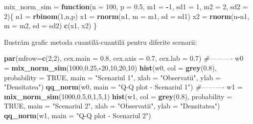 \documentclass[]{article}
\newenvironment{Shaded}{\begin{snugshade}}{\end{snugshade}}
\newcommand{\KeywordTok}[1]{\textcolor[rgb]{0.13,0.29,0.53}{\textbf{#1}}}
\newcommand{\DataTypeTok}[1]{\textcolor[rgb]{0.13,0.29,0.53}{#1}}
\newcommand{\DecValTok}[1]{\textcolor[rgb]{0.00,0.00,0.81}{#1}}
\newcommand{\FloatTok}[1]{\textcolor[rgb]{0.00,0.00,0.81}{#1}}
\newcommand{\StringTok}[1]{\textcolor[rgb]{0.31,0.60,0.02}{#1}}
\newcommand{\CommentTok}[1]{\textcolor[rgb]{0.56,0.35,0.01}{\textit{#1}}}
\newcommand{\OtherTok}[1]{\textcolor[rgb]{0.56,0.35,0.01}{#1}}
\newcommand{\ControlFlowTok}[1]{\textcolor[rgb]{0.13,0.29,0.53}{\textbf{#1}}}
\newcommand{\OperatorTok}[1]{\textcolor[rgb]{0.81,0.36,0.00}{\textbf{#1}}}
\newcommand{\NormalTok}[1]{#1}
\begin{document}
\begin{Shaded}
\begin{Highlighting}[]
\NormalTok{mix_norm_sim =}\StringTok{ }\ControlFlowTok{function}\NormalTok{(}\DataTypeTok{n =} \DecValTok{100}\NormalTok{, }\DataTypeTok{p =} \FloatTok{0.5}\NormalTok{, }\DataTypeTok{m1 =} \OperatorTok{-}\DecValTok{1}\NormalTok{, }\DataTypeTok{sd1 =} \DecValTok{1}\NormalTok{, }\DataTypeTok{m2 =} \DecValTok{2}\NormalTok{, }\DataTypeTok{sd2 =} \DecValTok{2}\NormalTok{)\{}
\NormalTok{  n1 =}\StringTok{ }\KeywordTok{rbinom}\NormalTok{(}\DecValTok{1}\NormalTok{,n,p)}
\NormalTok{  x1 =}\StringTok{ }\KeywordTok{rnorm}\NormalTok{(n1, }\DataTypeTok{m =}\NormalTok{ m1, }\DataTypeTok{sd =}\NormalTok{ sd1)}
\NormalTok{  x2 =}\StringTok{ }\KeywordTok{rnorm}\NormalTok{(n}\OperatorTok{-}\NormalTok{n1, }\DataTypeTok{m =}\NormalTok{ m2, }\DataTypeTok{sd =}\NormalTok{ sd2)}
  \KeywordTok{c}\NormalTok{(x1, x2)}
\NormalTok{\}}
\end{Highlighting}
\end{Shaded}

Ilustrăm grafic metoda cuantilă-cuantilă pentru diferite scenarii:

\begin{Shaded}
\begin{Highlighting}[]
\KeywordTok{par}\NormalTok{(}\DataTypeTok{mfrow=}\KeywordTok{c}\NormalTok{(}\DecValTok{2}\NormalTok{,}\DecValTok{2}\NormalTok{),}
     \DataTypeTok{cex.main =} \FloatTok{0.8}\NormalTok{,}
     \DataTypeTok{cex.axis =} \FloatTok{0.7}\NormalTok{,}
     \DataTypeTok{cex.lab =} \FloatTok{0.7}\NormalTok{)}
\CommentTok{#----------}
\NormalTok{w0 =}\StringTok{ }\KeywordTok{mix_norm_sim}\NormalTok{(}\DecValTok{1000}\NormalTok{,}\FloatTok{0.25}\NormalTok{,}\OperatorTok{-}\DecValTok{20}\NormalTok{,}\DecValTok{10}\NormalTok{,}\DecValTok{20}\NormalTok{,}\DecValTok{10}\NormalTok{)}
\KeywordTok{hist}\NormalTok{(w0, }\DataTypeTok{col =} \KeywordTok{grey}\NormalTok{(}\FloatTok{0.8}\NormalTok{),}
     \DataTypeTok{probability =} \OtherTok{TRUE}\NormalTok{,}
     \DataTypeTok{main =} \StringTok{"Scenariul 1"}\NormalTok{, }
     \DataTypeTok{xlab =} \StringTok{"Observatii"}\NormalTok{, }
     \DataTypeTok{ylab =} \StringTok{"Densitatea"}\NormalTok{)}
\KeywordTok{qq_norm}\NormalTok{(w0, }\DataTypeTok{main =} \StringTok{"Q-Q plot - Scenariul 1"}\NormalTok{)}
\CommentTok{#----------}
\NormalTok{w1 =}\StringTok{ }\KeywordTok{mix_norm_sim}\NormalTok{(}\DecValTok{1000}\NormalTok{,}\FloatTok{0.5}\NormalTok{,}\DecValTok{0}\NormalTok{,}\DecValTok{1}\NormalTok{,}\DecValTok{5}\NormalTok{,}\DecValTok{1}\NormalTok{)}
\KeywordTok{hist}\NormalTok{(w1, }\DataTypeTok{col =} \KeywordTok{grey}\NormalTok{(}\FloatTok{0.8}\NormalTok{),}
     \DataTypeTok{probability =} \OtherTok{TRUE}\NormalTok{,}
     \DataTypeTok{main =} \StringTok{"Scenariul 2"}\NormalTok{, }
     \DataTypeTok{xlab =} \StringTok{"Observatii"}\NormalTok{, }
     \DataTypeTok{ylab =} \StringTok{"Densitatea"}\NormalTok{)}
\KeywordTok{qq_norm}\NormalTok{(w1, }\DataTypeTok{main =} \StringTok{"Q-Q plot - Scenariul 2"}\NormalTok{)}
\end{Highlighting}
\end{Shaded}
\end{document}
